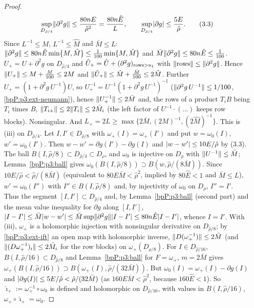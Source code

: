 \begin{proof}
\[\sup_{D_{\hat\rho/4}}\lVert \partial^2g\rVert\le\frac{80nE}{\hat\rho^2}=\frac{80n\hat E}{L},\qquad\sup_{D_{\hat\rho/4}}\lvert \partial g\rvert\le\frac{5E}{\hat\rho}.\tag{3.3}\]
Since $L^{-1}\le M$, $L^{-1}\le\hat M$ and $\bar M\le L$: $\lVert \partial^2g\rVert\le80n\hat E\min\{M,\hat M\}\le\frac1{100}\min\{M,\hat M\}$ and $\bar M\lVert \partial^2g\rVert\le80n\hat E\le\frac1{100}$.
\label{stepP:p3:st-U}
$U_+=U+\partial^2g$ on $D_{\hat\rho/4}$ and $\hat U_+=\hat U+(\partial^2g)_{\rm rows>n_1}$ with $\lVert \text{rows}\rVert\le\lVert \partial^2g\rVert$. Hence $\lVert U_+\rVert\le M+\frac M{100}\le2M$ and $\lVert \hat U_+\rVert\le\hat M+\frac{\hat M}{100}\le2\hat M$.
Further $U_+=(1+\partial^2g\,U^{-1})U$, so $U_+^{-1}=U^{-1}(1+\partial^2g\,U^{-1})^{-1}$ ($\lVert \partial^2g\,U^{-1}\rVert\le1/100$, \ref{bpP:p3:ext-neumann}), hence $\lVert U_+^{-1}\rVert\le2\bar M$ and, the rows of a product $T_iB$ being $T_i$ times $B$, $\lVert T_{i+}\rVert\le2\lVert T_i\rVert\le2\bar M_i$ (the left factor of $U^{-1}\cdot(\ldots)$ keeps row blocks). Nonsingular. And $L_+=2L\ge\max\{2\bar M,(2M)^{-1},(2\hat M)^{-1}\}$. This is (iii) on $D_{\hat\rho/4}$.
\label{stepP:p3:st-inj}
Let $I,I'\in D_{\hat\rho/8}$ with $\omega_+(I)=\omega_+(I')$ and put $w=\omega_0(I)$, $w'=\omega_0(I')$. Then $w-w'=\partial g(I')-\partial g(I)$ and $\lvert w-w'\rvert\le10E/\hat\rho$ by (3.3). The ball $B(I,\hat\rho/8)\subset D_{\hat\rho/4}\subset D_\rho$, and $\omega_0$ is injective on $D_\rho$ with $\lVert U^{-1}\rVert\le\bar M$; Lemma~\ref{bpP:p3:ball} gives $\omega_0(B(I,\hat\rho/8))\supset B(w,\hat\rho/(8\bar M))$. Since $10E/\hat\rho<\hat\rho/(8\bar M)$ (equivalent to $80E\bar M<\hat\rho^2$, implied by $80\hat E<1$ and $\bar M\le L$), $w'=\omega_0(I'')$ with $I''\in B(I,\hat\rho/8)$ and, by injectivity of $\omega_0$ on $D_\rho$, $I''=I'$. Thus the segment $[I,I']\subset D_{\hat\rho/4}$ and, by Lemma~\ref{bpP:p3:ball} (second part) and the mean value inequality for $\partial g$ along $[I,I']$,
$\lvert I-I'\rvert\le\bar M\lvert w-w'\rvert\le\bar M\sup\lVert \partial^2g\rVert\lvert I-I'\rvert\le80n\hat E\lvert I-I'\rvert$, whence $I=I'$. With (iii), $\omega_+$ is a holomorphic injection with nonsingular derivative on $D_{\hat\rho/8}$; by \ref{bpP:p3:ext-ift} an open map with holomorphic inverse, $\lVert D(\omega_+^{-1})\rVert\le2\bar M$ (and $\lVert (D\omega_+^{-1})_i\rVert\le2\bar M_i$ for the row blocks) on $\omega_+(D_{\hat\rho/8})$.
\label{stepP:p3:st-ihat}
For $I\in D_{\hat\rho/16}$, $B(I,\hat\rho/16)\subset D_{\hat\rho/8}$ and Lemma~\ref{bpP:p3:ball} for $F=\omega_+$, $m=2\bar M$ gives $\omega_+(B(I,\hat\rho/16))\supset B(\omega_+(I),\hat\rho/(32\bar M))$. But $\omega_0(I)=\omega_+(I)-\partial g(I)$ and $\lvert \partial g(I)\rvert\le5E/\hat\rho<\hat\rho/(32\bar M)$ (as $160E\bar M<\hat\rho^2$, because $160\hat E<1$). So $\hat\imath_+:=\omega_+^{-1}\circ\omega_0$ is defined and holomorphic on $D_{\hat\rho/16}$, with values in $B(I,\hat\rho/16)$, $\omega_+\circ\hat\imath_+=\omega_0$.

\end{proof}
